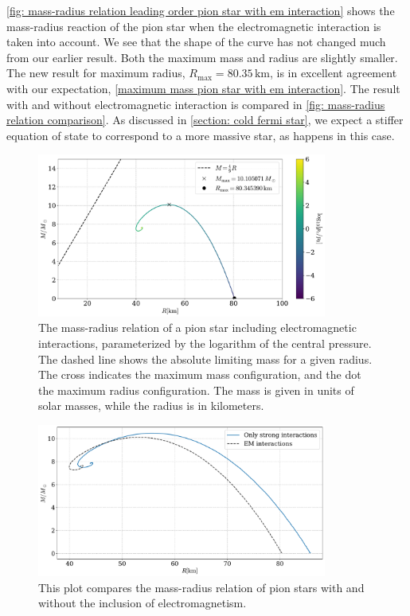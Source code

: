 \autoref{fig: mass-radius relation leading order pion star with em interaction} shows the mass-radius reaction of the pion star when the electromagnetic interaction is taken into account.
We see that the shape of the curve has not changed much from our earlier result. 
Both the maximum mass and radius are slightly smaller.
The new result for maximum radius, $R_\text{max} = 80.35 \, \text{km}$, is in excellent agreement with our expectation, \autoref{maximum mass pion star with em interaction}.
The result with and without electromagnetic interaction is compared in \autoref{fig: mass-radius relation comparison}.
As discussed in \autoref{section: cold fermi star}, we expect a stiffer equation of state to correspond to a more massive star, as happens in this case.

\begin{figure}[!htb]
    \centering
    \includegraphics[width=0.85\textwidth]{../scripts/figurer/pion_star/mass_radius_pion_star_EM.pdf}
    \caption{
        The mass-radius relation of a pion star including electromagnetic interactions, parameterized by the logarithm of the central pressure.
        The dashed line shows the absolute limiting mass for a given radius.
        The cross indicates the maximum mass configuration, and the dot the maximum radius configuration.
        The mass is given in units of solar masses, while the radius is in kilometers.
        }
    \label{fig: mass-radius relation leading order pion star with em interaction}
\end{figure}


\begin{figure}[!htb]
    \centering
    \includegraphics[width=0.85\textwidth]{../scripts/figurer/pion_star/mass_radius_pion_star_compare.pdf}
    \caption{
        This plot compares the mass-radius relation of pion stars with and without the inclusion of electromagnetism.
        }
        \label{fig: mass-radius relation comparison}
\end{figure}

